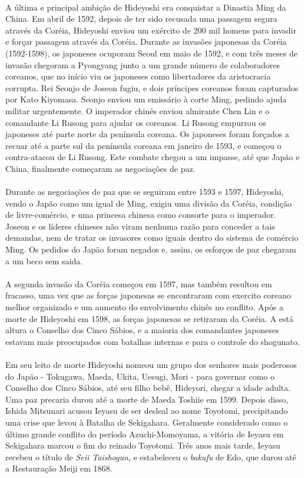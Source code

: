 \documentclass[12pt, a4paper]{article}
\begin{document}
            \\
            \indent A última e principal ambição de Hideyoshi era conquistar a Dinastia Ming da China. Em abril de 1592, depois de ter sido recusada uma passagem segura através da Coréia, Hideyoshi enviou um exército de 200 mil homens para invadir e forçar passagem através da Coréia. Durante as invasões japonesas da Coréia (1592-1598), os japoneses ocuporam Seoul em maio de 1592, e com três meses de invasão chegoram a Pyongyang junto a um grande número de colaboradores coreanos, que no início viu os japoneses como libertadores da aristocracia corrupta. Rei Seonjo de Joseon fugiu, e dois príncipes coreanos foram capturados por Kato Kiyomasa. Seonjo enviou um emissário à corte Ming, pedindo ajuda militar urgentemente. O imperador chinês enviou almirante Chen Lin e o comandante Li Rusong para ajudar os coreanos. Li Rusong empurrou os japoneses até parte norte da península coreana. Os japoneses foram forçados a recuar até a parte sul da península coreana em janeiro de 1593, e começou o contra-atacou de Li Rusong. Este combate chegou a um impasse, até que Japão e China, finalmente começaram as negociações de paz.\\
			\\
			\indent Durante as negociações de paz que se seguiram entre 1593 e 1597, Hideyoshi, vendo o Japão como um igual de Ming, exigiu uma divisão da Coréia, condição de livre-comércio, e uma princesa chinesa como consorte para o imperador. Joseon e os líderes chineses não viram nenhuma razão para conceder a tais demandas, nem de tratar os invasores como iguais dentro do sistema de comércio Ming. Os pedidos do Japão foram negados e, assim, os esforços de paz chegaram a um beco sem saida.\\
			\\
			\indent A segunda invasão da Coréia começou em 1597, mas também resultou em fracasso, uma vez que as  forças japonesas se encontraram com exercito coreano melhor organizado e um aumento do envolvimento chinês no conflito. Após a morte de Hideyoshi em 1598, as forças japonesas se retiraram da Coréia. A está altura o Conselho dos Cinco Sábios, e a maioria dos comandantes japoneses estavam mais preocupados com batalhas internas e para o controle do shogunato.\\
			\\
			\indent Em seu leito de morte Hideyoshi nomeou um grupo dos senhores mais poderosos do Japão - Tokugawa, Maeda, Ukita, Uesugi, Mori - para governar como o Conselho dos Cinco Sábios, até seu filho bebê, Hideyori, chegar a idade adulta. Uma paz precaria durou até a morte de Maeda Toshiie em 1599. Depois disso, Ishida Mitsunari acusou Ieyasu de ser desleal ao nome Toyotomi, precipitando uma crise que levou à Batalha de Sekigahara. Geralmente considerado como o último grande conflito do período Azuchi-Momoyama, a vitória de Ieyasu em Sekigahara marcou o fim do reinado Toyotomi. Três anos mais tarde, Ieyasu recebeu o título de \textit{Seii Taishogun}, e estabeleceu o \textit{bakufu} de Edo, que durou até a Restauração Meiji em 1868.\\
			
\end{document}
